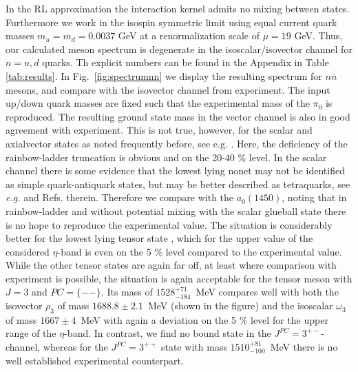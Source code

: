 In the RL approximation the interaction kernel admits no mixing between states. Furthermore we work in the isospin symmetric limit using equal current quark masses $m_u=m_d=0.0037$ GeV at a renormalization scale of $\mu = 19$ GeV. Thus, our calculated meson spectrum is degenerate in the isoscalar/isovector channel for $n=u,d$ quarks. Th explicit numbers can be found in the Appendix in Table \ref{tab:results}. In Fig.~\ref{fig:spectrumnn} we display the resulting spectrum for $n\bar{n}$ mesons, and compare with the isovector channel from experiment. The input up/down quark masses are fixed such that the experimental mass of the $\pi_0$ is reproduced. The resulting ground state mass in the vector channel is also in good agreement with experiment. This is not true, however, for the scalar and axialvector states as noted frequently before, see e.g. \cite{Watson:2004kd}. Here, the deficiency of the rainbow-ladder truncation is obvious and on the 20-40 \% level. In the scalar channel there is some evidence that the lowest lying nonet may not be identified as simple quark-antiquark states, but may be better described as tetraquarks, see {\it e.g.} \cite{Jaffe:1976ig,Giacosa:2006tf,Ebert:2008id,Parganlija:2012fy,Heupel:2012ua} and Refs. therein. Therefore we compare with the $a_0(1450)$, noting that in rainbow-ladder and without potential mixing with the scalar glueball state there is no hope to reproduce the experimental value. The situation is considerably better for the lowest lying tensor state \cite{Krassnigg:2010mh}, which for the upper value of the considered $\eta$-band is even on the 5 $\%$ level compared to the experimental value. While the other tensor states are again far off, at least where comparison with experiment is possible, the situation is again acceptable for the tensor meson with $J=3$ and $PC=\{--\}$. Its mass of $1528^{+71}_{-184}$~MeV compares well with both the isovector $\rho_3$ of mass $1688.8\pm2.1$~MeV (shown in the figure) and the isoscalar $\omega_3$ of mass $1667\pm4$~MeV with again a deviation on the 5 $\%$ level for the upper range of the $\eta$-band. In contrast, we find no bound state in the $J^{PC}=3^{+-}$-channel, whereas for the $J^{PC}=3^{++}$ state with mass $1510^{+81}_{-100}$~MeV there is no well established experimental counterpart.
